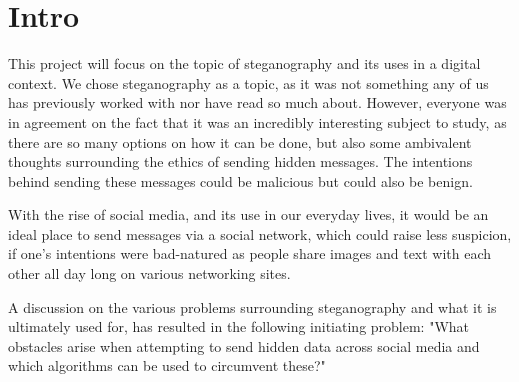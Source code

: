 \section*{Intro}
This project will focus on the topic of steganography and its uses in a digital context.
We chose steganography as a topic, as it was not something any of us has previously worked with nor have read so much about. However, everyone was in agreement on the fact that it was an incredibly interesting subject to study, as there are so many options on how it can be done, but also some ambivalent thoughts surrounding the ethics of sending hidden messages. The intentions behind sending these messages could be malicious but could also be benign.

With the rise of social media, and its use in our everyday lives, it would be an ideal place to send messages via a social network, which could raise less suspicion, if one's intentions were bad-natured as people share images and text with each other all day long on various networking sites.

A discussion on the various problems surrounding steganography and what it is ultimately used for, has resulted in the following initiating problem: 
"What obstacles arise when attempting to send hidden data across social media and which algorithms can be used to circumvent these?"